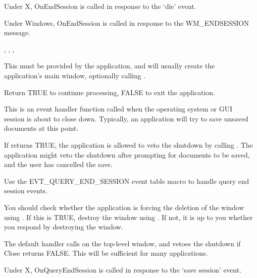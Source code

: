 Under X, OnEndSession is called in response to the `die' event.

Under Windows, OnEndSession is called in response to the WM\_ENDSESSION message.


,\rtfsp
{},\rtfsp
{},\rtfsp
{}

\label{wxapponinit}


This must be provided by the application, and will usually create the
application's main window, optionally calling .

Return TRUE to continue processing, FALSE to exit the application.

\label{wxapponqueryendsession}


This is an event handler function called when the operating system or GUI session is
about to close down. Typically, an application will try to save unsaved documents
at this point.

If  returns TRUE, the application
is allowed to veto the shutdown by calling .
The application might veto the shutdown after prompting for documents to be saved, and the
user has cancelled the save.

Use the EVT\_QUERY\_END\_SESSION event table macro to handle query end session events.

You should check whether the application is forcing the deletion of the window
using . If this is TRUE,
destroy the window using .
If not, it is up to you whether you respond by destroying the window.

The default handler calls  on the top-level window,
and vetoes the shutdown if Close returns FALSE. This will be sufficient for many applications.


Under X, OnQueryEndSession is called in response to the `save session' event.

